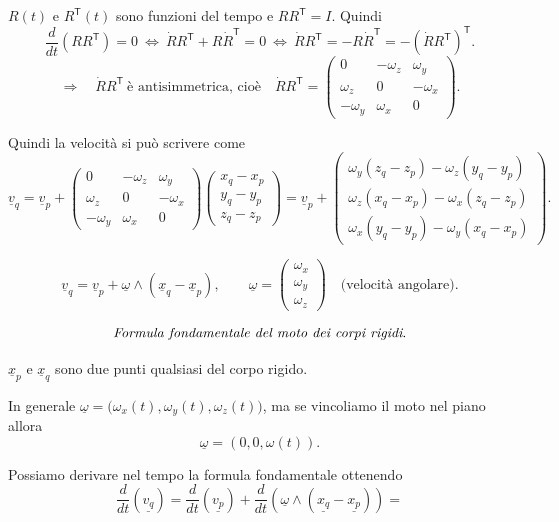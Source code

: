 $R(t)$ e $R^{\mathsf T}(t)$ sono funzioni del tempo e $RR^{\mathsf T}=I$.
Quindi
\[
\frac{d}{dt}(RR^{\mathsf T})=0
\ \Longleftrightarrow\
\dot{R}R^{\mathsf T}+R\dot{R}^{\mathsf T}=0
\ \Longleftrightarrow\
\dot{R}R^{\mathsf T}=-R\dot{R}^{\mathsf T}=-(\dot{R}R^{\mathsf T})^{\mathsf T}.
\]
\[
\Rightarrow\quad \dot{R}R^{\mathsf T}\ \text{è antisimmetrica, cioè}\quad
\dot{R}R^{\mathsf T}=
\begin{pmatrix}
0 & -\omega_z & \omega_y\\
\omega_z & 0 & -\omega_x\\
-\omega_y & \omega_x & 0
\end{pmatrix}.
\]

Quindi la velocità si può scrivere come
\[
\underline{v}_q=\underline{v}_p+
\begin{pmatrix}
0 & -\omega_z & \omega_y\\
\omega_z & 0 & -\omega_x\\
-\omega_y & \omega_x & 0
\end{pmatrix}
\begin{pmatrix}
x_q-x_p\\
y_q-y_p\\
z_q-z_p
\end{pmatrix}
=
\underline{v}_p+
\begin{pmatrix}
\omega_y(z_q-z_p)-\omega_z(y_q-y_p)\\
\omega_z(x_q-x_p)-\omega_x(z_q-z_p)\\
\omega_x(y_q-y_p)-\omega_y(x_q-x_p)
\end{pmatrix}.
\]

\[
\underline{v}_q=\underline{v}_p+\underline{\omega}\wedge(\underline{x}_q-\underline{x}_p),
\qquad
\underline{\omega}=
\begin{pmatrix}
\omega_x\\
\omega_y\\
\omega_z
\end{pmatrix}
\quad\text{(velocità angolare).}
\]

\[
\text{\emph{Formula fondamentale del moto dei corpi rigidi}.}
\]

\begin{oss}{}
$\underline{x}_p$ e $\underline{x}_q$ sono due punti qualsiasi del corpo rigido.
\end{oss}

\begin{oss}{}
In generale $\underline{\omega}=\bigl(\omega_x(t),\omega_y(t),\omega_z(t)\bigr)$, ma se vincoliamo il moto nel piano allora
\[
\underline{\omega}=(0,0,\omega(t)).
\]
\end{oss}
Possiamo derivare nel tempo la formula fondamentale ottenendo
\[
\frac{d}{dt}\left(\underline{v_q}\right)
=
\frac{d}{dt}\left(\underline{v_p}\right)
+
\frac{d}{dt}\left(\underline{\omega}\wedge\left(\underline{x_q}-\underline{x_p}\right)\right)
=
\]

